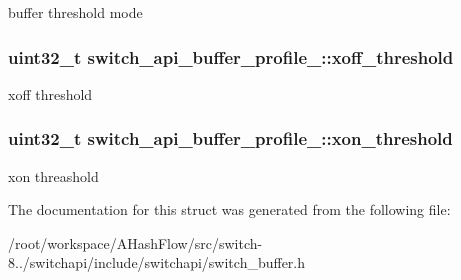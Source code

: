 buffer threshold mode \hypertarget{structswitch__api__buffer__profile___a5197456217ebf7695de96336d7cc15e9}{
\subsubsection[{xoff\+\_\+threshold}]{\setlength{\rightskip}{0pt plus 5cm}uint32\+\_\+t switch\+\_\+api\+\_\+buffer\+\_\+profile\+\_\+\+::xoff\+\_\+threshold}}\label{structswitch__api__buffer__profile___a5197456217ebf7695de96336d7cc15e9}
xoff threshold \hypertarget{structswitch__api__buffer__profile___a4a850a5574babf80d0433acbba5928ac}{
\subsubsection[{xon\+\_\+threshold}]{\setlength{\rightskip}{0pt plus 5cm}uint32\+\_\+t switch\+\_\+api\+\_\+buffer\+\_\+profile\+\_\+\+::xon\+\_\+threshold}}\label{structswitch__api__buffer__profile___a4a850a5574babf80d0433acbba5928ac}
xon threashold 

The documentation for this struct was generated from the following file\+:\begin{DoxyCompactItemize}
\item 
/root/workspace/\+A\+Hash\+Flow/src/switch-\/8../switchapi/include/switchapi/switch\+\_\+buffer.\+h\end{DoxyCompactItemize}
